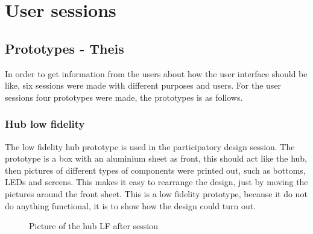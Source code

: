 \chapter{User sessions}
\section{Prototypes - Theis}
In order to get information from the users about how the user interface should be like, six sessions were made with different purposes and users. For the user sessions four prototypes were made, the prototypes is as follows.

\subsection{Hub low fidelity}
The low fidelity hub prototype is used in the participatory design session. The prototype is a box with an aluminium sheet as front, this should act like the hub, then pictures of different types of components were printed out, such as bottoms, LEDs and screens. This makes it easy to rearrange the design, just by moving the pictures around the front sheet. This is a low fidelity prototype, because it do not do anything functional, it is to show how the design could turn out.
\begin{figure}[H]
	\center
		\setlength\fboxsep{0pt}
		\setlength\fboxrule{1pt}
   	\caption{Picture of the hub LF after session}
   	\label{fig:LF hub after session}
\end{figure}

